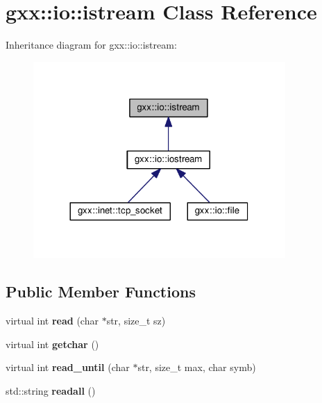 \hypertarget{classgxx_1_1io_1_1istream}{}\section{gxx\+:\+:io\+:\+:istream Class Reference}
\label{classgxx_1_1io_1_1istream}


Inheritance diagram for gxx\+:\+:io\+:\+:istream\+:
\nopagebreak
\begin{figure}[H]
\begin{center}
\leavevmode
\includegraphics[width=272pt]{classgxx_1_1io_1_1istream__inherit__graph}
\end{center}
\end{figure}
\subsection*{Public Member Functions}
\begin{DoxyCompactItemize}
\item 
virtual int {\bfseries read} (char $\ast$str, size\+\_\+t sz)\hypertarget{classgxx_1_1io_1_1istream_aaba879181cf83f2a8d6859eb703ce275}{}\label{classgxx_1_1io_1_1istream_aaba879181cf83f2a8d6859eb703ce275}

\item 
virtual int {\bfseries getchar} ()\hypertarget{classgxx_1_1io_1_1istream_ac6c3221181592d16ccb55b9846c00d6c}{}\label{classgxx_1_1io_1_1istream_ac6c3221181592d16ccb55b9846c00d6c}

\item 
virtual int {\bfseries read\+\_\+until} (char $\ast$str, size\+\_\+t max, char symb)\hypertarget{classgxx_1_1io_1_1istream_af1bf4b6e784d4c02091caef3151434cf}{}\label{classgxx_1_1io_1_1istream_af1bf4b6e784d4c02091caef3151434cf}

\item 
std\+::string {\bfseries readall} ()\hypertarget{classgxx_1_1io_1_1istream_a79298810ba40ce07e4e1e73085d4d922}{}\label{classgxx_1_1io_1_1istream_a79298810ba40ce07e4e1e73085d4d922}

\end{DoxyCompactItemize}
